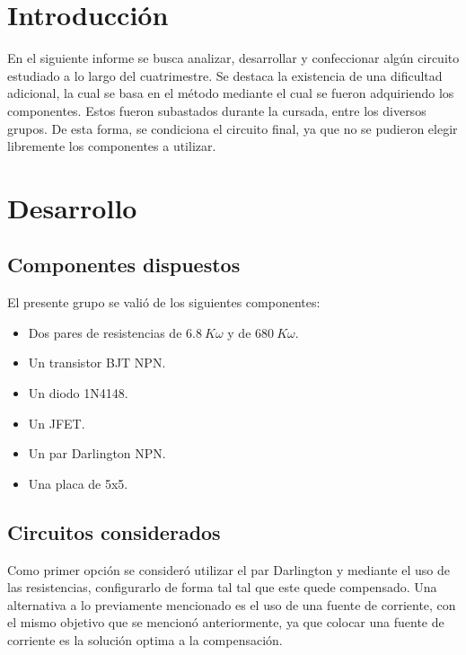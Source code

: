 







\tableofcontents
\newpage

\section{Introducción}
En el siguiente informe se busca analizar, desarrollar y confeccionar algún circuito estudiado a lo largo del cuatrimestre. Se destaca la existencia de una dificultad adicional, la cual se basa en el método mediante el cual se fueron adquiriendo los componentes. Estos fueron subastados durante la cursada, entre los diversos grupos. De esta forma, se condiciona el circuito final, ya que no se pudieron elegir libremente los componentes a utilizar.

\section{Desarrollo}

\subsection{Componentes dispuestos}
El presente grupo se valió de los siguientes componentes:
\begin{itemize}
	\item Dos pares de resistencias de $6.8 \ K\omega$ y de $680 \ K\omega$.
	\item Un transistor BJT NPN. 
	\item Un diodo 1N4148.
	\item Un JFET.
	\item Un par Darlington NPN.
	\item Una placa de 5x5.
\end{itemize}

\subsection{Circuitos considerados}
Como primer opción se consideró utilizar el par Darlington y mediante el uso de las resistencias, configurarlo de forma tal tal que este quede compensado. Una alternativa a lo previamente mencionado es el uso de una fuente de corriente, con el mismo objetivo que se mencionó anteriormente, ya que colocar una fuente de corriente es la solución optima a la compensación.

